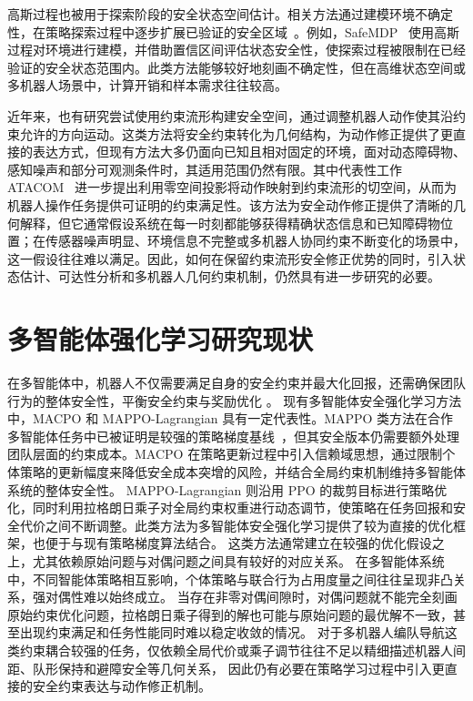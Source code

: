高斯过程也被用于探索阶段的安全状态空间估计。相关方法通过建模环境不确定性，在策略探索过程中逐步扩展已验证的安全区域~\cite{turchetta2016safe, brunke2022safe_learning_robotics}。例如，SafeMDP~\cite{turchetta2016safe} 使用高斯过程对环境进行建模，并借助置信区间评估状态安全性，使探索过程被限制在已经验证的安全状态范围内。此类方法能够较好地刻画不确定性，但在高维状态空间或多机器人场景中，计算开销和样本需求往往较高。

近年来，也有研究尝试使用约束流形构建安全空间，通过调整机器人动作使其沿约束允许的方向运动。这类方法将安全约束转化为几何结构，为动作修正提供了更直接的表达方式，但现有方法大多仍面向已知且相对固定的环境，面对动态障碍物、感知噪声和部分可观测条件时，其适用范围仍然有限。其中代表性工作 ATACOM~\cite{liu2022atacom, liu2023safe_manipulation} 进一步提出利用零空间投影将动作映射到约束流形的切空间，从而为机器人操作任务提供可证明的约束满足性。该方法为安全动作修正提供了清晰的几何解释，但它通常假设系统在每一时刻都能够获得精确状态信息和已知障碍物位置；在传感器噪声明显、环境信息不完整或多机器人协同约束不断变化的场景中，这一假设往往难以满足。因此，如何在保留约束流形安全修正优势的同时，引入状态估计、可达性分析和多机器人几何约束机制，仍然具有进一步研究的必要。

\section{多智能体强化学习研究现状}
在多智能体中，机器人不仅需要满足自身的安全约束并最大化回报，还需确保团队行为的整体安全性，平衡安全约束与奖励优化 \cite{chen2024duality,li2025coordinating,gronauer2022multiagent_survey}。
现有多智能体安全强化学习方法中，MACPO \cite{gu2023safe} 和 MAPPO-Lagrangian \cite{gu2023safe} 具有一定代表性。MAPPO 类方法在合作多智能体任务中已被证明是较强的策略梯度基线~\cite{yu2022surprising_mappo}，但其安全版本仍需要额外处理团队层面的约束成本。MACPO 在策略更新过程中引入信赖域思想，通过限制个体策略的更新幅度来降低安全成本突增的风险，并结合全局约束机制维持多智能体系统的整体安全性。
MAPPO-Lagrangian 则沿用 PPO 的裁剪目标进行策略优化，同时利用拉格朗日乘子对全局约束权重进行动态调节，使策略在任务回报和安全代价之间不断调整。此类方法为多智能体安全强化学习提供了较为直接的优化框架，也便于与现有策略梯度算法结合。
这类方法通常建立在较强的优化假设之上，尤其依赖原始问题与对偶问题之间具有较好的对应关系。
在多智能体系统中，不同智能体策略相互影响，个体策略与联合行为占用度量之间往往呈现非凸关系，强对偶性难以始终成立。
当存在非零对偶间隙时，对偶问题就不能完全刻画原始约束优化问题，拉格朗日乘子得到的解也可能与原始问题的最优解不一致，甚至出现约束满足和任务性能同时难以稳定收敛的情况。
对于多机器人编队导航这类约束耦合较强的任务，仅依赖全局代价或乘子调节往往不足以精细描述机器人间距、队形保持和避障安全等几何关系，
因此仍有必要在策略学习过程中引入更直接的安全约束表达与动作修正机制。

